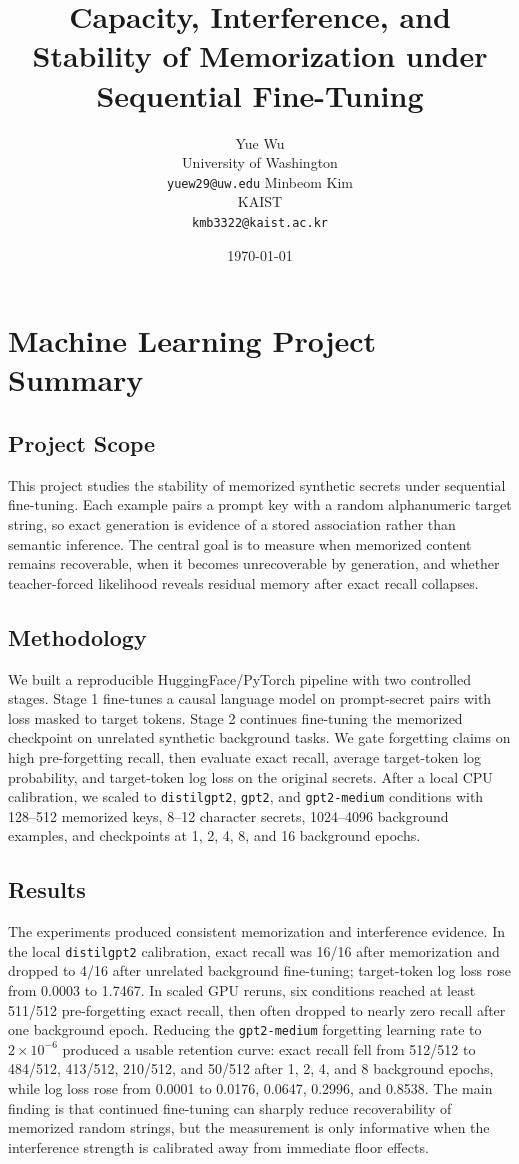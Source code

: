 \documentclass{article}
\title{Capacity, Interference, and Stability of Memorization under Sequential Fine-Tuning}
\author{
Yue Wu \\
University of Washington \\
\texttt{yuew29@uw.edu}
\And
Minbeom Kim \\
KAIST \\
\texttt{kmb3322@kaist.ac.kr}
}
\date{\today}
\begin{document}
\maketitle
\section*{\centering Machine Learning Project Summary}

\subsection*{Project Scope}
This project studies the stability of memorized synthetic secrets under sequential fine-tuning. Each example pairs a prompt key with a random alphanumeric target string, so exact generation is evidence of a stored association rather than semantic inference. The central goal is to measure when memorized content remains recoverable, when it becomes unrecoverable by generation, and whether teacher-forced likelihood reveals residual memory after exact recall collapses.

\subsection*{Methodology}
We built a reproducible HuggingFace/PyTorch pipeline with two controlled stages. Stage 1 fine-tunes a causal language model on prompt-secret pairs with loss masked to target tokens. Stage 2 continues fine-tuning the memorized checkpoint on unrelated synthetic background tasks. We gate forgetting claims on high pre-forgetting recall, then evaluate exact recall, average target-token log probability, and target-token log loss on the original secrets. After a local CPU calibration, we scaled to \texttt{distilgpt2}, \texttt{gpt2}, and \texttt{gpt2-medium} conditions with 128--512 memorized keys, 8--12 character secrets, 1024--4096 background examples, and checkpoints at 1, 2, 4, 8, and 16 background epochs.

\subsection*{Results}
The experiments produced consistent memorization and interference evidence. In the local \texttt{distilgpt2} calibration, exact recall was 16/16 after memorization and dropped to 4/16 after unrelated background fine-tuning; target-token log loss rose from 0.0003 to 1.7467. In scaled GPU reruns, six conditions reached at least 511/512 pre-forgetting exact recall, then often dropped to nearly zero recall after one background epoch. Reducing the \texttt{gpt2-medium} forgetting learning rate to $2 \times 10^{-6}$ produced a usable retention curve: exact recall fell from 512/512 to 484/512, 413/512, 210/512, and 50/512 after 1, 2, 4, and 8 background epochs, while log loss rose from 0.0001 to 0.0176, 0.0647, 0.2996, and 0.8538. The main finding is that continued fine-tuning can sharply reduce recoverability of memorized random strings, but the measurement is only informative when the interference strength is calibrated away from immediate floor effects.
\end{document}

